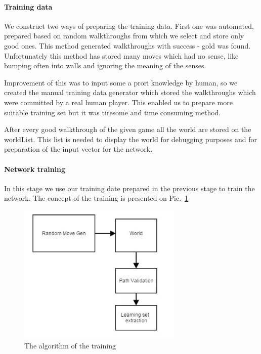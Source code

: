 \documentclass[a4paper]{article}
\begin{document}
	\paragraph{Training data}
	We construct two ways of preparing the training data. First one was automated, prepared 
	based on random walkthroughs from which we select and store only good ones. This method
	 generated walkthroughs with success - gold was found. Unfortunately this method has stored 
	 many moves which had no sense, like bumping often into walls and ignoring the meaning 
	 of the senses.  
	 
	 Improvement of this was to input some a prori knowledge by human, so we created the manual
	 training data generator which stored the walkthroughs which were committed by a real human player.
	 This enabled us to prepare more suitable training set but it was tiresome and time consuming method.
	 
	After every good walkthrough of the given game all the world are stored on the worldList. This list is needed to display the world for debugging purposes and for preparation of the input vector for the network.
	 
	 
	\paragraph{Network training}
	In this stage we use our training date prepared in the previous stage to train the network.
	The concept of the training is presented on Pic.~\ref{pic:trainDataAuto}
	 \begin{figure}[!h]
		\centering	
		\includegraphics[width=0.7\textwidth]{pic/trainDataAuto.jpg}
		\caption{The algorithm of the training}
		\label{pic:trainDataAuto}
	\end{figure}
	
\end{document}
